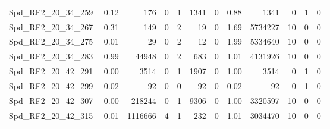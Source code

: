 \begin{longtable}[c]{@{}lrrrrrrrrrrr@{}}
Spd\_RF2\_20\_34\_259         & 0.12                   & 176                     & 0                       & 1                      & 1341                    & 0                       & 0.88                    & 1341                     & 0                        & 1                        & 0                        \\
Spd\_RF2\_20\_34\_267         & 0.31                   & 149                     & 0                       & 2                      & 19                      & 0                       & 1.69                    & 5734227                  & 10                       & 0                        & 0                        \\
Spd\_RF2\_20\_34\_275         & 0.01                   & 29                      & 0                       & 2                      & 12                      & 0                       & 1.99                    & 5334640                  & 10                       & 0                        & 0                        \\
Spd\_RF2\_20\_34\_283         & 0.99                   & 44948                   & 0                       & 2                      & 683                     & 0                       & 1.01                    & 4131926                  & 10                       & 0                        & 0                        \\
Spd\_RF2\_20\_42\_291         & 0.00                   & 3514                    & 0                       & 1                      & 1907                    & 0                       & 1.00                    & 3514                     & 0                        & 1                        & 0                        \\
Spd\_RF2\_20\_42\_299         & -0.02                  & 92                      & 0                       & 0                      & 92                      & 0                       & 0.02                    & 92                       & 0                        & 1                        & 0                        \\
Spd\_RF2\_20\_42\_307         & 0.00                   & 218244                  & 0                       & 1                      & 9306                    & 0                       & 1.00                    & 3320597                  & 10                       & 0                        & 0                        \\
Spd\_RF2\_20\_42\_315         & -0.01                  & 1116666                 & 4                       & 1                      & 232                     & 0                       & 1.01                    & 3034470                  & 10                       & 0                        & 0                        \\

\end{longtable}
